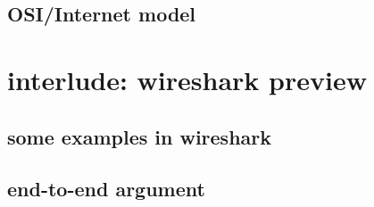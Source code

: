 

\subsection{OSI/Internet model}



\section{interlude: wireshark preview}



\subsection{some examples in wireshark}


\subsection{end-to-end argument}



